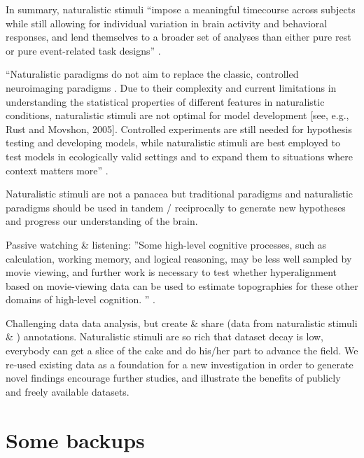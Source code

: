 
%
In summary, naturalistic stimuli ``impose a meaningful timecourse across
subjects while still allowing for individual variation in brain activity and
behavioral responses, and lend themselves to a broader set of analyses than
either pure rest or pure event-related task designs'' \citep[][p.
142]{finn2017can}.

%
``Naturalistic paradigms do not aim to replace the classic, controlled
neuroimaging paradigms \citep{sonkusare2019naturalistic}.
%
Due to their complexity and current limitations in understanding the statistical
properties of different features in naturalistic conditions, naturalistic
stimuli are not optimal for model development [see, e.g., Rust and Movshon,
2005].
%
Controlled experiments are still needed for hypothesis testing and developing
models, while naturalistic stimuli are best employed to test models in
ecologically valid settings and to expand them to situations where context
matters more'' \citep[][p. 19]{saarimaki2021naturalistic}.

%
Naturalistic stimuli are not a panacea but traditional paradigms and
naturalistic paradigms should be used in tandem / reciprocally to generate new
hypotheses and progress our understanding of the brain.


%
Passive watching \& listening: ''Some high-level cognitive processes, such as
calculation, working memory, and logical reasoning, may be less well sampled by
movie viewing, and further work is necessary to test whether hyperalignment
based on movie-viewing data can be used to estimate topographies for these other
domains of high-level cognition.  '' \citep{jiahui2020predicting}.

%
Challenging data data analysis, but create \& share (data from naturalistic
stimuli \& ) annotations.
%
Naturalistic stimuli are so rich that dataset decay is low, everybody can get
a slice of the cake and do his/her part to advance the field.
%
We re-used existing data as a foundation for a new investigation in order to
generate novel findings encourage further studies, and illustrate the benefits
of publicly and freely available datasets.




\pagebreak


\section{Some backups}


